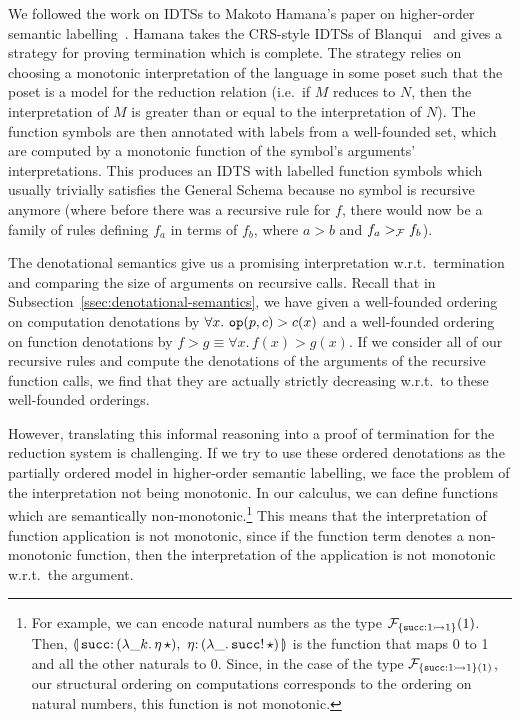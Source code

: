 We followed the work on IDTSs to Makoto Hamana's paper on higher-order
semantic labelling~\cite{hamana2007higher}. Hamana takes the CRS-style
IDTSs of Blanqui~\cite{blanqui2000termination} and gives a strategy for
proving termination which is complete. The strategy relies on choosing a
monotonic interpretation of the language in some poset such that the poset
is a model for the reduction relation (i.e.\ if $M$ reduces to $N$, then
the interpretation of $M$ is greater than or equal to the interpretation of
$N$). The function symbols are then annotated with labels from a
well-founded set, which are computed by a monotonic function of the
symbol's arguments' interpretations. This produces an IDTS with labelled
function symbols which usually trivially satisfies the General Schema
because no symbol is recursive anymore (where before there was a recursive
rule for $f$, there would now be a family of rules defining $f_a$ in terms
of $f_b$, where $a > b$ and $f_a >_{\mathcal{F}} f_b$).

The denotational semantics give us a promising interpretation w.r.t.\
termination and comparing the size of arguments on recursive calls. Recall
that in Subsection~\ref{ssec:denotational-semantics}, we have given a
well-founded ordering on computation denotations by
$\forall x.\ \mathtt{op}(p, c) > c(x)$ and a well-founded ordering on function
denotations by $f > g \equiv \forall x.\, f(x) > g(x)$. If we consider all
of our recursive rules and compute the denotations of the arguments of the
recursive function calls, we find that they are actually strictly
decreasing w.r.t.\ to these well-founded orderings.

However, translating this informal reasoning into a proof of termination
for the reduction system is challenging. If we try to use these ordered
denotations as the partially ordered model in higher-order semantic
labelling, we face the problem of the interpretation not being
monotonic. In our calculus, we can define functions which are semantically
non-monotonic.\footnote{For example, we can encode natural numbers as the
  type $\mathcal{F}_{\{\mathtt{succ} : 1 \rightarrowtail 1\}}(1)$. Then,
  $\banana{\onto{\op{succ}}{(\lam{\_ k}{\etaE{\star}})},\
    \onto{\eta}{(\lam{\_}{\ap{\op{succ}!}{\star}})}}$ is the function that
  maps 0 to 1 and all the other naturals to 0. Since, in the case of the
  type $\mathcal{F}_{\{\mathtt{succ} : 1 \rightarrowtail 1\}(1)}$, our structural ordering on
  computations corresponds to the ordering on natural numbers, this
  function is not monotonic.} This means that the interpretation of
function application is not monotonic, since if the function term denotes a
non-monotonic function, then the interpretation of the application is not
monotonic w.r.t.\ the argument.

